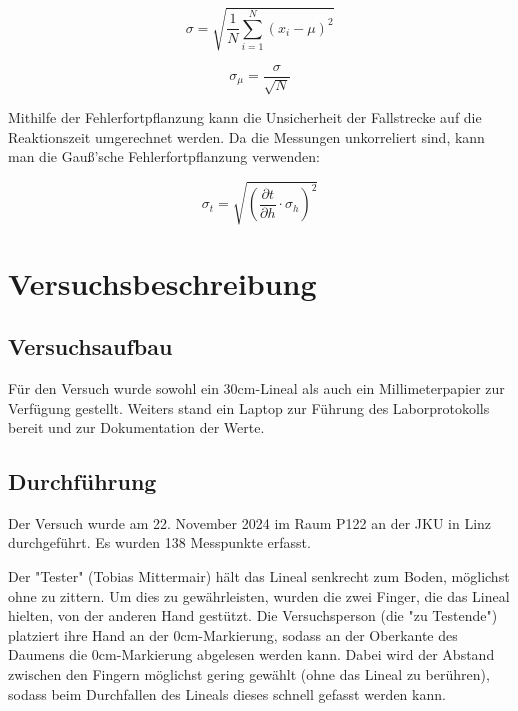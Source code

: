 \documentclass[a4paper,12pt]{article}
\begin{document}
\begin{equation}
    \label{eq:standardabweichung}
    \sigma = \sqrt{\frac{1}{N} \sum_{i=1}^{N} (x_i - \mu)^2}
\end{equation}

\begin{equation}
    \label{eq:standardabweichungDesMittelwerts}
    \sigma_\mu = \frac{\sigma}{\sqrt{N}}
\end{equation}

Mithilfe der Fehlerfortpflanzung kann die Unsicherheit der Fallstrecke auf die Reaktionszeit
umgerechnet werden. Da die Messungen unkorreliert sind, kann man die Gauß'sche Fehlerfortpflanzung
verwenden:

\begin{equation}
    \label{eq:GaußFehlerfortpflanzung}
    \sigma_t = \sqrt{\left(\frac{\partial t}{\partial h} \cdot \sigma_h\right)^2}
\end{equation}


\section{Versuchsbeschreibung}
\subsection{Versuchsaufbau}

Für den Versuch wurde sowohl ein 30cm-Lineal als auch ein Millimeterpapier zur Verfügung gestellt. Weiters stand ein 
Laptop zur Führung des Laborprotokolls bereit und zur Dokumentation der Werte.

\subsection{Durchführung}

Der Versuch wurde am 22. November 2024 im Raum P122 an der JKU in Linz durchgeführt. Es wurden 138 Messpunkte erfasst.

Der "Tester" (Tobias Mittermair) hält das Lineal senkrecht zum
Boden, möglichst ohne zu zittern. Um dies zu gewährleisten, wurden die zwei Finger, die das Lineal hielten, von 
der anderen Hand gestützt. Die Versuchsperson (die "zu
Testende") platziert ihre Hand an der 0cm-Markierung, sodass an der Oberkante des Daumens die 0cm-Markierung 
abgelesen werden kann. Dabei wird der Abstand zwischen den Fingern möglichst gering gewählt (ohne das Lineal zu 
berühren), sodass beim Durchfallen des Lineals dieses schnell gefasst werden kann.
\end{document}
